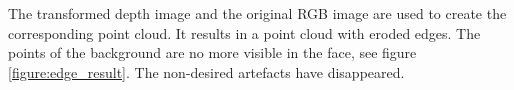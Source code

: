 The transformed depth image and the original RGB image are used to create the corresponding point cloud. It results in a point cloud with eroded edges. The points of the background are no more visible in the face, see figure \ref{figure:edge_result}. The non-desired artefacts have disappeared. 



